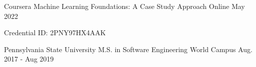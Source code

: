 

\begin{cventries}
  \cventry
    {Coursera} %
    {Machine Learning Foundations: A Case Study Approach} %
    {Online}
    {May 2022} %
    {
      \begin{cvitems} %
        \item {Credential ID: 2PNY97HX4AAK}
      \end{cvitems}
    }
  \cventry
    {Pennsylvania State University} %
    {M.S. in Software Engineering} %
    {World Campus} %
    {Aug. 2017 - Aug 2019} %
    {
    }
\end{cventries}
